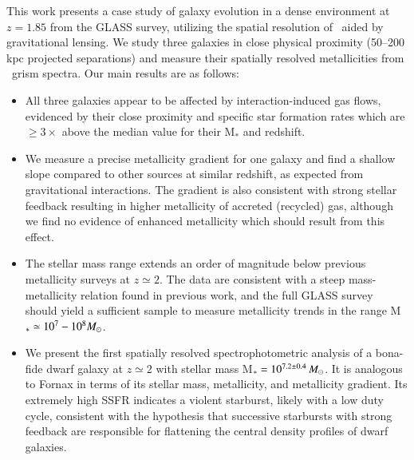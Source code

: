This work presents a case study of galaxy evolution in a dense environment at $z=1.85$ from the GLASS survey,
utilizing the spatial resolution of \hst\ aided by gravitational lensing. We study three galaxies in close
physical proximity (50--200 kpc projected separations) and measure their spatially resolved metallicities from
\hst\ grism spectra. Our main results are as follows:
\begin{itemize}
    \item All three galaxies appear to be affected by interaction-induced gas flows, evidenced by their close proximity and specific star formation rates which are $\geq3\times$ above the median value for their M$_*$ and redshift.
    \item We measure a precise metallicity gradient for one galaxy and find a shallow slope compared to other sources at similar redshift, as expected from gravitational interactions. The gradient is also consistent with strong stellar feedback resulting in higher metallicity of accreted (recycled) gas, although we find no evidence of enhanced metallicity which should result from this effect.
    \item The stellar mass range extends an order of magnitude below previous metallicity surveys at $z\simeq2$. The data are consistent with a steep mass-metallicity relation found in previous work, and the full GLASS survey should yield a sufficient sample to measure metallicity trends in the range M$_* \simeq10^7-10^8 M_\odot$.
    \item We present the first spatially resolved spectrophotometric analysis of a bona-fide dwarf galaxy at $z\simeq2$ with stellar mass M$_*=10^{7.2\pm0.4}\, M_\odot$. It is analogous to Fornax in terms of its stellar mass, metallicity, and metallicity gradient. Its extremely high SSFR indicates a violent starburst, likely with a low duty cycle, consistent with the hypothesis that successive starbursts with strong feedback are responsible for flattening the central density profiles of dwarf galaxies.
\end{itemize}

